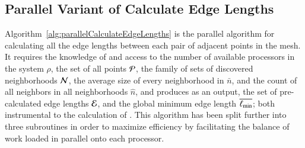 %
%
\subsection{Parallel Variant of Calculate Edge Lengths}
\label{ch6sCELPssPVCEL}
Algorithm~\ref{alg:parallelCalculateEdgeLengths} is the parallel algorithm for calculating all the edge lengths between each pair of adjacent points in the mesh. It requires the knowledge of and access to the number of available processors in the system $\rho$, the set of all points $\mathcal{P}$, the family of sets of discovered neighborhoods $\mathcal{N}$, the average size of every neighborhood in $\bar{n}$, and the count of all neighbors in all neighborhoods $\hat{n}$, and produces as an output, the set of pre-calculated edge lengths $\mathcal{E}$, and the global minimum edge length $\overline{\ell_\text{min}}$; both instrumental to the calculation of . This algorithm has been split further into three subroutines in order to maximize efficiency by facilitating the balance of work loaded in parallel onto each processor.

